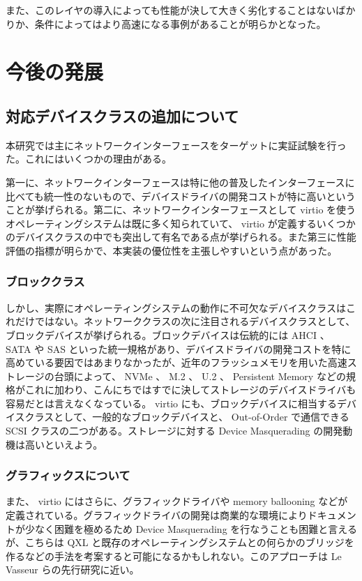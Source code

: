 \documentclass[a4paper,11pt,report]{ltjsbook}
\begin{document}
また、このレイヤの導入によっても性能が決して大きく劣化することはないばかりか、条件によってはより高速になる事例があることが明らかとなった。

\section{今後の発展}

\subsection{対応デバイスクラスの追加について}

本研究では主にネットワークインターフェースをターゲットに実証試験を行った。これにはいくつかの理由がある。

第一に、ネットワークインターフェースは特に他の普及したインターフェースに比べても統一性のないもので、デバイスドライバの開発コストが特に高いということが挙げられる。第二に、ネットワークインターフェースとして virtio を使うオペレーティングシステムは既に多く知られていて、 virtio が定義するいくつかのデバイスクラスの中でも突出して有名である点が挙げられる。また第三に性能評価の指標が明らかで、本実装の優位性を主張しやすいという点があった。

\subsubsection{ブロッククラス}

しかし、実際にオペレーティングシステムの動作に不可欠なデバイスクラスはこれだけではない。ネットワーククラスの次に注目されるデバイスクラスとして、ブロックデバイスが挙げられる。ブロックデバイスは伝統的には AHCI 、 SATA や SAS といった統一規格があり、デバイスドライバの開発コストを特に高めている要因ではあまりなかったが、近年のフラッシュメモリを用いた高速ストレージの台頭によって、 NVMe 、 M.2 、 U.2 、 Persistent Memory などの規格がこれに加わり、こんにちではすでに決してストレージのデバイスドライバも容易だとは言えなくなっている。 virtio にも、ブロックデバイスに相当するデバイスクラスとして、一般的なブロックデバイスと、 Out-of-Order で通信できる SCSI クラスの二つがある。ストレージに対する Device Masquerading の開発動機は高いといえよう。

\subsubsection{グラフィックスについて}

また、 virtio にはさらに、グラフィックドライバや memory ballooning などが定義されている。グラフィックドライバの開発は商業的な環境によりドキュメントが少なく困難を極めるため Device Masquerading を行なうことも困難と言えるが、こちらは QXL と既存のオペレーティングシステムとの何らかのブリッジを作るなどの手法を考案すると可能になるかもしれない。このアプローチは Le Vasseur らの先行研究\cite{reuse}に近い。
\end{document}
